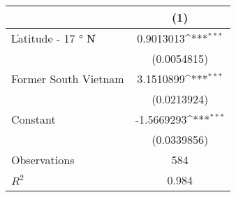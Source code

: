 {
\def\sym#1{\ifmmode^{#1}\else\(^{#1}\)\fi}
\begin{tabular}{l*{1}{c}}
\toprule
                    &\multicolumn{1}{c}{(1)}         \\
\midrule
\|Latitude - 17 $°$ N\|&   0.9013013\sym{***}\\
                    & (0.0054815)         \\
\addlinespace
Former South Vietnam&   3.1510899\sym{***}\\
                    & (0.0213924)         \\
\addlinespace
Constant            &  -1.5669293\sym{***}\\
                    & (0.0339856)         \\
\midrule
Observations        &         584         \\
\(R^{2}\)           &       0.984         \\
\bottomrule
\end{tabular}
}
